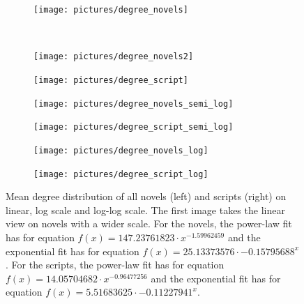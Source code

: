 \documentclass[a4paper, 12pt]{report}
\begin{document}
\begin{figure}
\begin{subfigure}{\textwidth}
\centering
\texttt{[image: pictures/degree\_novels]}
\end{subfigure}
\\
\begin{subfigure}{.45\textwidth}
\centering
\texttt{[image: pictures/degree\_novels2]}
\end{subfigure}
\hfill
\begin{subfigure}{.45\textwidth}
\centering
\texttt{[image: pictures/degree\_script]}
\end{subfigure}
\hfill
\begin{subfigure}{.45\textwidth}
\centering
\texttt{[image: pictures/degree\_novels\_semi\_log]}
\end{subfigure}
\hfill
\begin{subfigure}{.45\textwidth}
\centering
\texttt{[image: pictures/degree\_script\_semi\_log]}
\end{subfigure}
\hfill
\begin{subfigure}{.45\textwidth}
\centering
\texttt{[image: pictures/degree\_novels\_log]}
\end{subfigure}
\hfill
\begin{subfigure}{.45\textwidth}
\centering
\texttt{[image: pictures/degree\_script\_log]}
\end{subfigure}
\caption{Mean degree distribution of all novels (left) and scripts (right) on linear, log scale and log-log scale. The first image takes the linear view on novels with a wider scale. For the novels, the power-law fit has for equation $f(x) =  147.23761823  \cdot x^{-1.59962459}$ and the exponential fit has for equation $f(x) = 25.13373576 \cdot -0.15795688^x$.  For the scripts, the power-law fit has for equation $f(x) = 14.05704682 \cdot x^{-0.96477256}$ and the exponential fit has for equation $f(x) = 5.51683625 \cdot -0.11227941^x$.}
\label{cumulated_degree_novel}
\end{figure}
\end{document}
